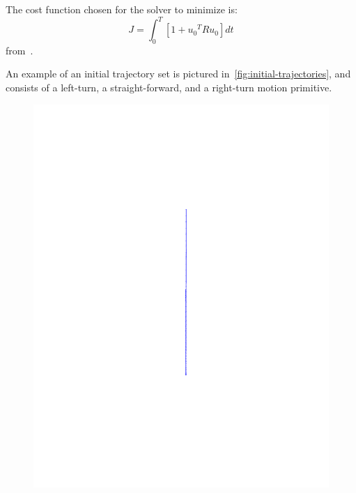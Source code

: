 The cost function chosen for the solver to minimize is:
\begin{equation}
  J = \int_{0}^{T} \left[ 1 + {u_{0}}^{T}Ru_{0} \right] dt
\end{equation}
from~\cite{majumdarRobustOnlineMotion2013}.

An example of an initial trajectory set is pictured
in~\cref{fig:initial-trajectories}, and consists of a left-turn, a
straight-forward, and a right-turn motion primitive.

\begin{figure}
  \centering
  \begin{minipage}[b]{0.2\textwidth}
    \includegraphics[width=\textwidth]{figures/method/straight-trajector}
  \end{minipage}
  \hfill
  \begin{minipage}[b]{0.2\textwidth}

\end{minipage}
\end{figure}
